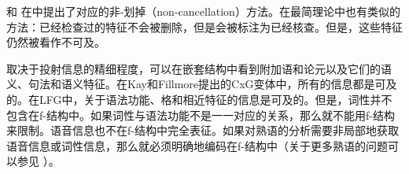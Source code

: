  \citet[]{Higginbotham85a}和 \citet{Winkler97a}在\gbtc 中提出了对应的非-划掉（non-cancellation）方法。在最简理论中也有类似的方法：已经检查过的特征不会被删除，但是会被标注为已经核查\citep[]{Stabler2010b}。但是，这些特征仍然被看作不可及。\label{page-non-cancellation-end}

取决于投射信息的精细程度，可以在嵌套结构中看到附加语和论元以及它们的语义、句法和语义特征。在Kay和Fillmore提出的CxG变体中，所有的信息都是可及的。在LFG中，关于语法功能、格和相近特征的信息是可及的。但是，词性并不包含在f-结构中。如果词性与语法功能不是一一对应的关系，那么就不能用f-结构来限制。语音信息也不在f-结构中完全表征。如果对熟语的分析需要非局部地获取语音信息或词性信息，那么就必须明确地编码在f-结构中（关于更多熟语的问题可以参见 ）。

